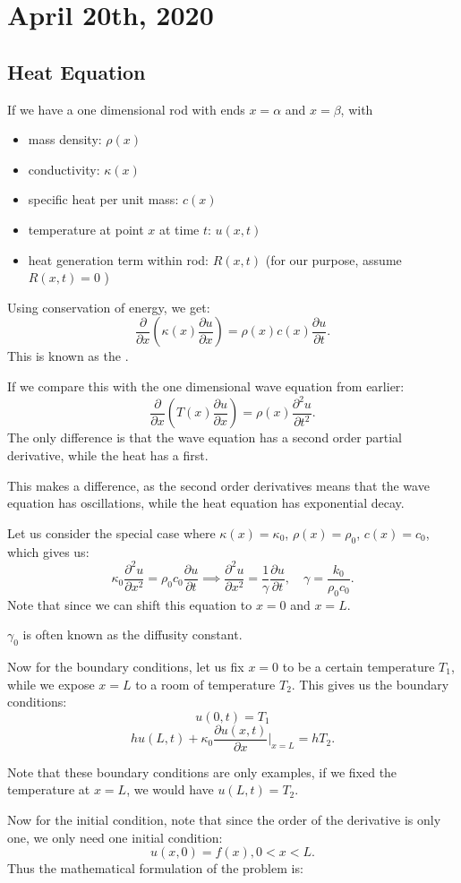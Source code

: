\documentclass[../main/main.tex]{subfiles}
\begin{document}
\section{April 20th, 2020}
\subsection{Heat Equation}
If we have a one dimensional rod with ends $x=\alpha$ and $x=\beta$, with
\begin{itemize}
	\item mass density: $\rho(x)$
	\item conductivity: $\kappa(x)$
	\item specific heat per unit mass: $c(x)$
	\item temperature at point $x$ at time $t$: $u(x,t)$
	\item heat generation term within rod: $R(x,t)$ (for our purpose, assume  $R(x,t)=0$ )
\end{itemize}
Using conservation of energy, we get: \[
	\frac{\partial }{\partial x} \left( \kappa(x) \frac{\partial u}{\partial x}  \right) = \rho(x) c(x) \frac{\partial u}{\partial t} 
.\] This is known as the . 
\begin{remark}
	If we compare this with the one dimensional wave equation from earlier: \[
		\frac{\partial }{\partial x} \left( T(x) \frac{\partial u}{\partial x}  \right) = \rho(x) \frac{\partial ^2 u}{\partial t^2} 
	.\] The only difference is that the wave equation has a second order partial derivative, while the heat has a first. 
	
	This makes a difference, as the second order derivatives means that the wave equation has oscillations, while the heat equation has exponential decay.
\end{remark}
Let us consider the special case where $\kappa(x) = \kappa_0$, $\rho(x) = \rho_0$, $c(x) = c_0$, which gives us: \[
\kappa_0 \frac{\partial ^2 u}{\partial x^2}  = \rho_0c_0 \frac{\partial u}{\partial t} \implies \frac{\partial ^2 u}{\partial x^2} = \frac{1}{\gamma} \frac{\partial u}{\partial t} ,\quad \gamma= \frac{k_0}{\rho_0c_0} 
.\] Note that since we can shift this equation to $x=0$ and $x=L$.
\begin{remark}
	$\gamma_0$ is often known as the diffusity constant.
\end{remark}
Now for the boundary conditions, let us fix $x=0$ to be a certain temperature $T_1$, while we expose $x=L$ to a room of temperature $T_2$. This gives us the boundary conditions: \[
u(0,t) = T_1\]\[ h u(L,t) + \kappa_0 \frac{\partial u(x,t)}{\partial x} \bigg\rvert_{x=L} = hT_2
.\] 
\begin{remark}
	Note that these boundary conditions are only examples, if we fixed the temperature at $x=L$, we would have $u(L,t) = T_2$.
\end{remark}
Now for the initial condition, note that since the order of the derivative is only one, we only need one initial condition: \[
	u(x,0) = f(x), 0 < x < L
.\] Thus the mathematical formulation of the problem is:
\end{document}
